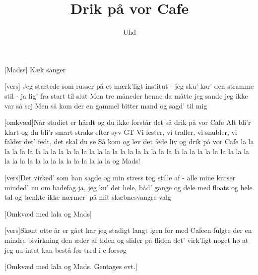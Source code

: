 \documentclass[a4paper,11pt]{article}
\title{Drik på vor Cafe}
\author{Uhd}
\begin{document}
\maketitle

\begin{roles}
[Madss] Kæk sanger
\end{roles}

\begin{props}
\end{props}

  
\begin{song}
[vers] Jeg startede som russer på et mærk'ligt institut
- jeg sku' kør' den stramme stil - ja lig' fra start til slut
Men tre måneder henne da måtte jeg sande
jeg ikke var så sej
Men så kom der en gammel bitter mand og sagd' til mig


[omkvæd]Når studiet er hårdt og du ikke forstår det
så drik på vor Cafe
Alt bli'r klart og du bli'r smart
straks efter syv GT
Vi fester, vi traller, vi snubler, vi falder
det' fedt, det skal du se
Så kom og lev det fede liv
og drik på vor Cafe
la la la la la 
la la la la la
la la la la la la la la la la la la
la la la la
la la la la la
la la la la la
la la la la la la la la la la la la
og Mads!

[vers]Det virked' som han sagde og min stress tog stille af
- alle mine kurser minded' nu om badefag
ja, jeg ku' det hele, båd' gange og dele
med floats og hele tal
og tænkte ikke nærmer' på mit skæbnesvangre valg

[Omkvæd med lala og Mads]

[vers]Skønt otte år er gået har jeg stadigt langt igen
for med Cafeen fulgte der en mindre bivirkning
den æder af tiden og slider på fliden
det' virk'ligt noget hø
at jeg nu intet kan bestå før tred-i-e forsøg

[Omkvæd med lala og Mads. Gentages evt.]


\end{song}
\end{document}
